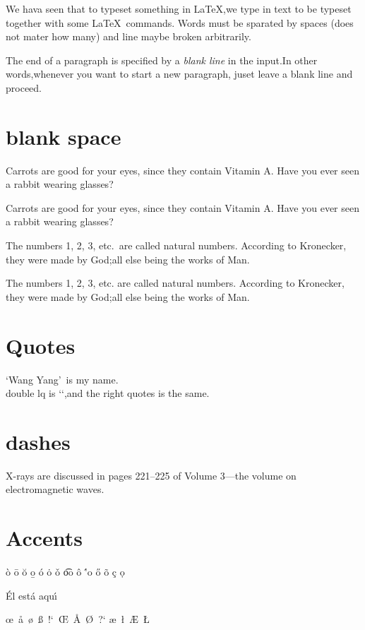 \documentclass{article}
\begin{document}
We hava seen that to typeset something in \LaTeX ,we type in text to be typeset together with some \LaTeX\   commands.
Words must be sparated by spaces (does not mater how many) and line maybe broken arbitrarily.

The end of a paragraph is specified by a \emph{blank line} in the input.In other words,whenever you want to start a new paragraph, juset leave a blank line and proceed.

\section{blank space}
Carrots are good for your eyes, since they contain Vitamin A. Have you ever seen a rabbit wearing glasses?

Carrots are good for your eyes, since they contain Vitamin A\@. Have you ever seen a rabbit wearing glasses?

The numbers 1, 2, 3, etc.\ are called natural numbers. According to Kronecker, they were made by God;all else being the works of Man.

The numbers 1, 2, 3, etc. are called natural numbers. According to Kronecker, they were made by God;all else being the works of Man.



\section{Quotes} %
\lq Wang Yang\rq\ is my name.\\
double lq is \lq\lq,and the right quotes is the same.
\section{dashes}
X-rays are discussed in pages 221--225 of Volume 3---the volume on electromagnetic waves.

\section{Accents}

\`o \=o \u o \b o \'o \.o \v o \t oo \^o \''o \H o \~o \c c \d o


\'{E}l est\'{a} aqu\'{\i}

\oe\ \aa\ \o\ \ss\ !`\ \OE\ \AA\ \O\ ?` \ae\ \l\ \AE\ \L
\end{document}
